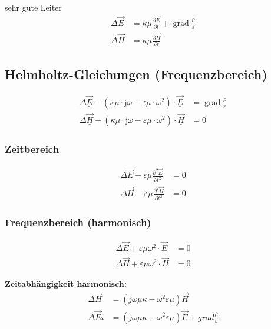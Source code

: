 sehr gute Leiter
\begin{align*}
    \Delta \vec{E} & =\kappa \mu \frac{\partial \vec{E}}{\partial t}+\operatorname{grad} \frac{\rho}{\varepsilon} \\
    \Delta \vec{H} & =\kappa \mu \frac{\partial \vec{H}}{\partial t}
\end{align*}

\subsection{Helmholtz-Gleichungen (Frequenzbereich)}
\begin{align*}
    \Delta \underline{\vec{E}}-\left(\kappa \mu \cdot \mathrm{j} \omega-\varepsilon \mu \cdot \omega^{2}\right) \cdot \underline{\vec{E}} & = \operatorname{grad} \frac{\rho}{\varepsilon} \\
    \Delta \underline{\vec{H}}-\left(\kappa \mu \cdot \mathrm{j} \omega-\varepsilon \mu \cdot \omega^{2}\right) \cdot \underline{\vec{H}} & = 0
\end{align*}

\subsubsection{Zeitbereich}
\begin{align*}
    \Delta \vec{E}-\varepsilon \mu \frac{\partial^{2} \vec{E}}{\partial t^{2}} & =0 \\
    \Delta \vec{H}-\varepsilon \mu \frac{\partial^{2} \vec{H}}{\partial t^{2}} & =0
\end{align*}

\subsubsection{Frequenzbereich (harmonisch)}
\begin{align*}
    \Delta \underline{\vec{E}}+\varepsilon \mu \omega^{2} \cdot \underline{\vec{E}} & =0 \\
    \Delta \underline{\vec{H}}+\varepsilon \mu \omega^{2} \cdot \underline{\vec{H}} & =0
\end{align*}

\textbf{Zeitabhängigkeit harmonisch:}
\begin{align*}
    \Delta \vec{H}   & = (j \omega \mu \kappa - \omega^2 \varepsilon \mu ) \vec{H}                                  \\
    \Delta \vec{E} i & = (j \omega \mu \kappa - \omega^2 \varepsilon \mu ) \vec{E} + grad \frac{ \rho}{\varepsilon}
\end{align*}

